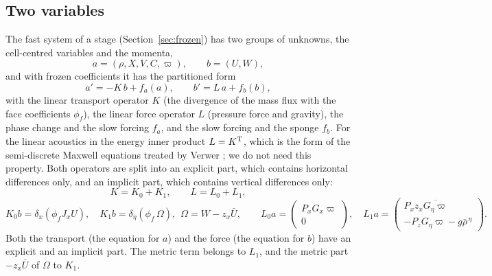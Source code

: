 \documentclass[11pt,a4paper]{article}
\newcommand{\pv}{\varpi}      %
\begin{document}
\subsection{Two variables}
The fast system of a stage (Section~\ref{sec:frozen}) has two groups of unknowns, the cell-centred
variables and the momenta,
\[
a=(\rho,X,V,C,\pv),\qquad b=(U,W),
\]
and with frozen coefficients it has the partitioned form
\begin{equation}
a'=-K\,b+f_a(a),\qquad b'=L\,a+f_b(b),\label{eq:part}
\end{equation}
with the linear transport operator $K$ (the divergence of the mass flux with the face coefficients
$\phi_f$), the linear force operator $L$ (pressure force and gravity), the phase change and the slow
forcing $f_a$, and the slow forcing and the sponge $f_b$. For the linear acoustics in the energy inner
product $L=K^{\rm T}$, which is the form of the semi-discrete Maxwell equations treated by Verwer
\cite{verwer}; we do not need this property. Both operators are split into an explicit part, which
contains horizontal differences only, and an implicit part, which contains vertical differences only:
\begin{equation}
K=K_0+K_1,\qquad L=L_0+L_1,\label{eq:KL}
\end{equation}
\[
K_0b=\delta_x(\phi_fJ_xU),\quad K_1b=\delta_\eta(\phi_f\,\Omega),\ \ \Omega=W-z_x\bar U,\qquad
L_0a=\begin{pmatrix}P_xG_x\pv\\0\end{pmatrix},\quad
L_1a=\begin{pmatrix}P_xz_x\overline{G_\eta\pv}\\-P_zG_\eta\pv-g\bar\rho^{\,\eta}\end{pmatrix}.
\]
Both the transport (the equation for $a$) and the force (the equation for $b$) have an explicit and an
implicit part. The metric term belongs to $L_1$, and the metric part $-z_x\bar U$ of $\Omega$ to $K_1$.
\end{document}
